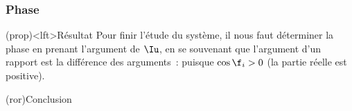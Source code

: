 \documentclass[../../main/main.tex]{subfiles}
\begin{document}
\subsubsection{Phase}
\begin{tcb}(prop)<lft>{Résultat}
	Pour finir l'étude du système, il nous faut déterminer la phase en prenant
	l'argument de $\Iu$, en se souvenant que l'argument d'un rapport est la
	différence des arguments~:
	\psw{
		\begin{gather*}
			\f_i
			= \underbrace{\cancel{\arg(E_0/R)}}_{=0}
			- \arg \left( 1 + \jj Q \left(
				\frac{\w}{\w_0} - \frac{\w_0}{\w}
				\right) \right)
			\\\Lra
			\boxed{\tan\f_i = -Q\left( \frac{\w}{\w_0} - \frac{\w_0}{\w} \right)}
			\qavec
			\boxed{\f_i \in \left] - \frac{\pi}{2}\,; \frac{\pi}{2} \right[}
		\end{gather*}
	}
	puisque $\cos\f_i > 0$ (la partie réelle est positive).
\end{tcb}
\begin{tcb}(ror){Conclusion}
\end{tcb}
\end{document}
